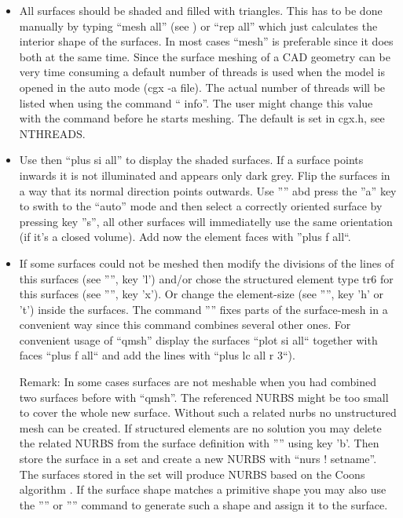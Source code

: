 \documentclass{article}
\begin{document}
\begin{appendix}
\begin{itemize}
\item All surfaces should be shaded and filled with triangles. This has to be done manually by typing ``mesh all'' (see ) or ``rep all'' which just calculates the interior shape of the surfaces. In most cases ``mesh'' is preferable since it does both at the same time. Since the surface meshing of a CAD geometry can be very time consuming a default number of threads is used when the model is opened in the auto mode (cgx -a file). The actual number of threads will be listed when using the command `` info''. The user might change this value with the command  before he starts meshing. The default is set in cgx.h, see NTHREADS.

\item Use then ``plus si all'' to display the shaded surfaces. If a surface points inwards it is not illuminated and appears only dark grey. Flip the surfaces in a way that its normal direction points outwards. Use '''' abd press the ''a'' key to swith to the ``auto'' mode and then select a correctly oriented surface by pressing key ''s'', all other surfaces will immediatelly use the same orientation (if it's a closed volume). Add now the element faces with ''plus f all``.

\item If some surfaces could not be meshed then modify the divisions of the lines of this surfaces (see '''', key 'l') and/or chose the structured element type tr6 for this surfaces (see '''', key 'x'). Or change the element-size (see '''', key 'h' or 't') inside the surfaces. The command '''' fixes parts of the surface-mesh in a convenient way since this command combines several other ones. For convenient usage of ``qmsh'' display the surfaces ``plot si all`` together with faces ``plus f all`` and add the lines with ``plus lc all r 3``).

Remark: In some cases surfaces are not meshable when you had combined two surfaces before with ``qmsh''. The referenced NURBS might be too small to cover the whole new surface. Without such a related nurbs no unstructured mesh can be created. If structured elements are no solution you may delete the related NURBS from the surface definition with '''' using key 'b'. Then store the surface in a set and create a new NURBS with ``nurs ! setname''. The surfaces stored in the set will produce NURBS based on the Coons algorithm \cite{Coons}. If the surface shape matches a primitive shape you may also use the '''' or '''' command to generate such a shape and assign it to the surface.


\end{itemize}
\end{appendix}
\end{document}
